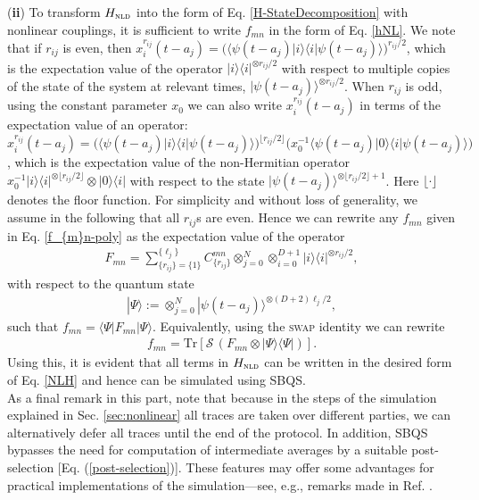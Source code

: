 \documentclass[aps,pra,twocolumn,floatfix,groupedaddress,superscriptaddress,nofootinbib,notitlepage]{revtex4-2}
\begin{document}
(\textbf{ii}) To transform $H_{\textsc{nld}}$ into the form of Eq. \eqref{H-StateDecomposition} with nonlinear couplings, it is sufficient to write $f_{mn}$ in the form of Eq. \eqref{hNL}. We note that if $r_{ij}$ is even, then $x_{i}^{r_{ij}}(t-a_{j})=\big(\langle \psi(t-a_{j})|i \rangle\langle i|\psi(t-a_{j}) \rangle\big)^{r_{ij}/2}$, which is the expectation value of the operator $|i\rangle\langle i|^{\otimes r_{ij}/2}$ with respect to multiple copies of the state of the system at relevant times, $|\psi(t-a_{j})\rangle^{\otimes r_{ij}/2}$. When $r_{ij}$ is odd, using the constant parameter $x_{0}$ we can also write $x_{i}^{r_{ij}}(t-a_{j})$ in terms of the expectation value of an operator: $x_{i}^{r_{ij}}(t-a_{j})= \big(\langle \psi(t-a_{j})|i \rangle\langle i|\psi(t-a_{j})\rangle\big)^{\lfloor {r_{ij}}/{2} \rfloor} \big(x_{0}^{-1}\langle \psi(t-a_{j})|0 \rangle\langle i|\psi(t-a_{j})\rangle\big)$, which is the expectation value of the non-Hermitian operator 
$x_{0}^{-1}|i\rangle\langle i|^{ \otimes\lfloor r_{ij}/2\rfloor}\otimes |0\rangle\langle i|$ with respect to the state $|\psi(t-a_{j}) \rangle^{\otimes\lfloor r_{ij}/2\rfloor+1}$. Here $\lfloor \cdot \rfloor$ denotes the floor function. For simplicity and without loss of generality, we assume in the following that all $r_{ij}$s are even. Hence we can rewrite any $f_{mn}$ given in Eq. \eqref{f_{m}n-poly} as the expectation value of the operator 
\begin{align}
F_{mn}=\textstyle{\sum}_{\{r_{ij}\}=\{1\}}^{\{\ell_{j}\}} C^{mn}_{\{r_{ij}\}} \textstyle{\otimes_{j=0}^{N} \otimes_{i=0}^{D+1} }  | i\rangle\langle i|^{\otimes r_{ij}/2},
\end{align}
with respect to the quantum state
\begin{align}
\label{Psi}
|\Psi\rangle:=\textstyle{\otimes}_{j=0}^{N} |\psi(t-a_{j}) \rangle^{\otimes  (D+2) \ell_{j}/2},
\end{align}
such that $f_{mn}=\langle\Psi|F_{mn}|\Psi \rangle$. Equivalently, using the \textsc{swap} identity we can rewrite 
\begin{align}
f_{mn}=\mathrm{Tr}[\mathcal{S}\,(F_{mn}\otimes|\Psi \rangle\langle\Psi|)].
\end{align}
Using this, it is evident that all terms in $H_{\textsc{nld}}$ can be written in the desired form of Eq. \eqref{NLH} and hence can be simulated using SBQS.  \\ 

As a final remark in this part, note that because in the steps of the simulation explained in Sec. \ref{sec:nonlinear} all traces are taken over different parties, we can alternatively defer all traces until the end of the protocol. In addition, SBQS bypasses the need for computation of intermediate averages by a suitable post-selection [Eq. (\ref{post-selection})]. These features may offer some advantages for practical implementations of the simulation---see, e.g., remarks made in Ref. \cite{Molmer-NME2}.
\end{document}
